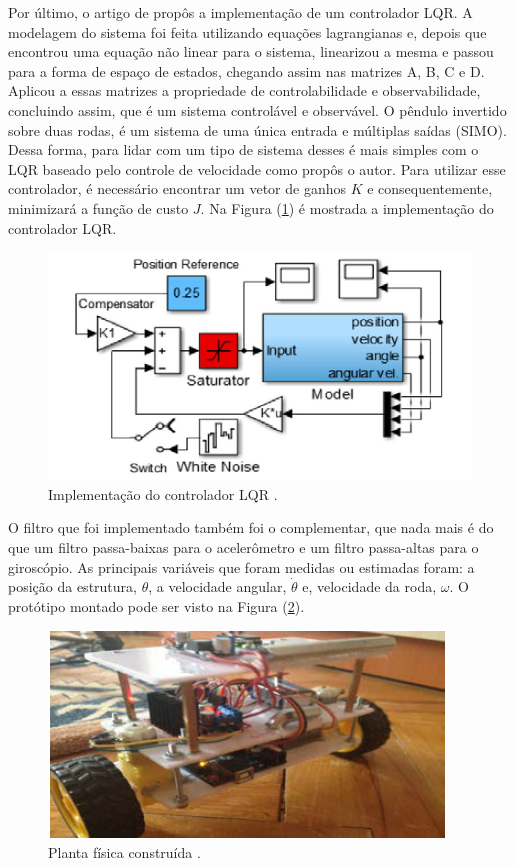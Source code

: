 Por último, o artigo de \cite{ME:18} propôs a implementação de um controlador LQR. A modelagem do sistema foi feita utilizando equações lagrangianas e, depois que encontrou uma equação não linear para o sistema, linearizou a mesma e passou para a forma de espaço de estados, chegando assim nas matrizes A, B, C e D. Aplicou a essas matrizes a propriedade de controlabilidade e observabilidade, concluindo assim, que é um sistema controlável e observável. O pêndulo invertido sobre duas rodas, é um sistema de uma única entrada e múltiplas saídas (SIMO). Dessa forma, para lidar com um tipo de sistema desses é mais simples com o LQR baseado pelo controle de velocidade como propôs o autor. Para utilizar esse controlador, é necessário encontrar um vetor de ganhos $K$ e consequentemente, minimizará a função de custo $J$. Na Figura (\ref{fig:estadoArte_REF3.1}) é mostrada a implementação do controlador LQR.
\begin{figure}[H]
    \centering
    \includegraphics[scale=0.85]{EstadoArte/REF3_1.PNG}
    \caption{Implementação do controlador LQR
    \citep{ME:18}.}
    \label{fig:estadoArte_REF3.1}
\end{figure}

O filtro que foi implementado também foi o complementar, que nada mais é do que um filtro passa-baixas para o acelerômetro e um filtro passa-altas para o giroscópio. As principais variáveis que foram medidas ou estimadas foram: a posição da estrutura, $\theta$, a velocidade angular, $\dot{\theta}$ e, velocidade da roda, $\omega$. O protótipo montado pode ser visto na Figura (\ref{fig:estadoArte_REF3_2}). 
\begin{figure}[H]
    \centering
    \includegraphics[scale=0.8]{EstadoArte/REF3_2}
    \caption{Planta física construída
    \citep{ME:18}.}
    \label{fig:estadoArte_REF3_2}
\end{figure}

